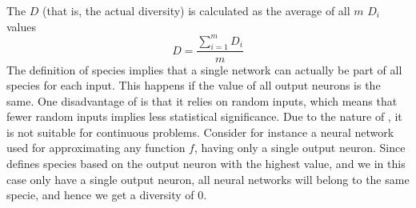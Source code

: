 The \dia{} $D$ (that is, the actual diversity) is calculated as the average of all $m$ $D_i$ values
%
\[D =\frac{\sum_{i=1}^m{D_i}}{m}\]
%
The definition of species implies that a single network can actually be part of all species for each input.
This happens if the value of all output neurons is the same.
One disadvantage of \dia{} is that it relies on random inputs, which means that fewer random inputs implies less statistical significance.
Due to the nature of \dia, it is not suitable for continuous problems.
Consider for instance a neural network used for approximating any function $f$, having only a single output neuron.
Since \dia defines species based on the output neuron with the highest value, and we in this case only have a single output neuron, all neural networks will belong to the same specie, and hence we get a diversity of 0.  

